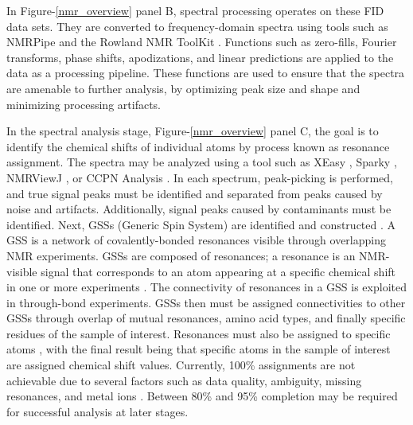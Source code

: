 In Figure-\ref{nmr_overview} panel B, 
spectral processing operates on these FID data sets.  They are 
converted to frequency-domain spectra using tools such as NMRPipe \cite{nmrpipe}
and the Rowland NMR ToolKit \cite{rnmrtk}.  Functions such as 
zero-fills, Fourier transforms, phase shifts, apodizations, and linear 
predictions are applied to the data as a processing pipeline.  These 
functions are used to ensure that the spectra are amenable to further 
analysis, by optimizing peak size and shape and minimizing processing 
artifacts.

In the spectral analysis stage, Figure-\ref{nmr_overview} panel C,
the goal is to identify the 
chemical shifts of individual atoms by process known as resonance assignment.
The spectra may be analyzed using a tool such as XEasy \cite{xeasy}, 
Sparky \cite{sparky}, NMRViewJ \cite{nmrviewj}, or CCPN Analysis \cite{ccpn}.  
In each spectrum, peak-picking is performed, and true signal peaks must 
be identified and separated from peaks caused by noise and artifacts.  
Additionally, signal peaks caused by contaminants must be identified.  
Next, GSSs (Generic Spin System) are identified and constructed \cite{ccpn}. 
A GSS is a network of covalently-bonded resonances visible through 
overlapping NMR experiments.  GSSs are composed of resonances; a 
resonance is an NMR-visible signal that corresponds to an atom appearing 
at a specific chemical shift in one or more experiments \cite{ccpn}.  
The connectivity of resonances in a GSS is exploited 
in through-bond experiments.  GSSs then must be assigned 
connectivities to other GSSs through overlap of mutual resonances, 
amino acid types, and finally specific residues of the sample of interest. 
Resonances must also be assigned to specific atoms \cite{ccpn}, 
with the final result being that specific atoms in the sample of interest 
are assigned chemical shift values.  Currently, 100\% assignments are not 
achievable due to several factors such as data quality, ambiguity,
missing resonances, and metal ions \cite{guerry2011automated}.
Between 80\% and 95\% completion may be required \cite{williamson2009automated}
for successful analysis at later stages.

